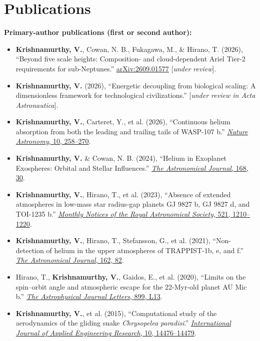 \documentclass[10pt,a4paper]{article}
\begin{document}
\section{Publications}

\textbf{Primary-author publications (first or second author):}

\begin{itemize}

\item
\textbf{Krishnamurthy, V.}, Cowan, N. B., Fukagawa, M., \& Hirano, T. (2026),
``Beyond five scale heights: Composition- and cloud-dependent Ariel Tier-2
requirements for sub-Neptunes.''
\href{https://arxiv.org/abs/2609.01577}{arXiv:2609.01577}
[\emph{under review}].

\item
\textbf{Krishnamurthy, V.} (2026),
``Energetic decoupling from biological scaling: A dimensionless framework
for technological civilizations.''
[\emph{under review in Acta Astronautica}].

\item
\textbf{Krishnamurthy, V.}, Carteret, Y., et al. (2026),
``Continuous helium absorption from both the leading and trailing tails of WASP-107 b.''
\href{https://doi.org/10.1038/s41550-025-02710-8}
{\emph{Nature Astronomy}, 10, 258--270}.

\item
\textbf{Krishnamurthy, V.} \& Cowan, N. B. (2024),
``Helium in Exoplanet Exospheres: Orbital and Stellar Influences.''
\href{https://doi.org/10.3847/1538-3881/ad5441}
{\emph{The Astronomical Journal}, 168, 30}.

\item
\textbf{Krishnamurthy, V.}, Hirano, T., et al. (2023),
``Absence of extended atmospheres in low-mass star radius-gap planets GJ 9827 b, GJ 9827 d, and TOI-1235 b.''
\href{https://doi.org/10.1093/mnras/stad404}
{\emph{Monthly Notices of the Royal Astronomical Society}, 521, 1210--1220}.

\item
\textbf{Krishnamurthy, V.}, Hirano, T., Stefansson, G., et al. (2021),
``Non-detection of helium in the upper atmospheres of TRAPPIST-1b, e, and f.''
\href{https://doi.org/10.3847/1538-3881/ac0d57}
{\emph{The Astronomical Journal}, 162, 82}.

\item
Hirano, T., \textbf{Krishnamurthy, V.}, Gaidos, E., et al. (2020),
``Limits on the spin--orbit angle and atmospheric escape for the
22-Myr-old planet AU Mic b.''
\href{https://doi.org/10.3847/2041-8213/aba6eb}
{\emph{The Astrophysical Journal Letters}, 899, L13}.

\item
\textbf{Krishnamurthy, V.}, et al. (2015),
``Computational study of the aerodynamics of the gliding snake
\textit{Chrysopelea paradisi}.''
\href{https://www.academia.edu/69469489/Computational_study_of_the_aerodynamics_of_the_gliding_snake_Chrysopelea_Paradisi}
{\emph{International Journal of Applied Engineering Research},
10, 14476--14479}.

\end{itemize}
\end{document}
